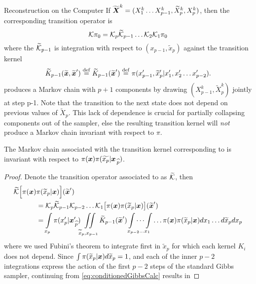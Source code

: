 \begin{chapter}{Reconstruction on the Computer}
If $\widetilde{\mbox{\boldmath$X$}}^k = (X_1^k\dots X_{p-1}^k,\widetilde X_{p}^k,X_p^k)$, then the corresponding transition operator is
\begin{equation}
  \mathcal K\pi_0 = \mathcal K_p \widetilde {\mathcal K}_{p-1}\dots \mathcal K_2 \mathcal K_1 \pi_0
\end{equation}
where the $\widetilde{\mathcal K}_{p-1}$ is integration with respect to $(x_{p-1},\tilde x_p)$ against the transition kernel
\begin{equation}
  \widetilde K_{p-1}(\widetilde{\mbox{\boldmath$x$}},\widetilde{\mbox{\boldmath$x$}}') \stackrel{\rm def}{=} \widetilde K_{p-1}(\widetilde{\mbox{\boldmath$x$}}') \stackrel{\rm def}{=} \pi(x_{p-1}',\widetilde x_p'|x_1',x_2'\dots x_{p-2}').
\end{equation}
 produces a Markov chain with $p+1$ components by drawing $(X_{p-1}^k,\tilde X_p^k)$ jointly at step p-1. 
Note that the transition to the next state does not depend on previous values of $\tilde X_p$.
This lack of dependence is crucial for partially collapsing components out of the sampler, else the resulting transition kernel will \emph{not} produce a Markov chain invariant with respect to $\pi$.
\begin{prop}\label{thm:conditionedGibbsStationary}
  The Markov chain associated with the transition kernel corresponding to  is invariant with respect to $\pi(\mbox{\boldmath$x$})\pi(\widetilde{x_p}|\mbox{\boldmath$x$}_{\,\widehat{p}})$.
\end{prop}
\begin{proof}
  Denote the transition operator associated to  as $\widetilde {\mathcal K}$, then
  \begin{align}
    \widetilde{\mathcal K}\Big[ \pi(\mbox{\boldmath$x$})&\pi(\widetilde x_p|\mbox{\boldmath$x$})\Big](\widetilde{\mbox{\boldmath$x$}}') \nonumber \\ 
    &= \mathcal K_p \widetilde{\mathcal K}_{p-1} \mathcal K_{p-2}\dots\mathcal K_{1} \big[\pi(\mbox{\boldmath$x$})\pi(\widetilde x_p|\mbox{\boldmath$x$})\big](\widetilde{\mbox{\boldmath$x$}}') \nonumber\\
    &= \int\limits_{x_p} \pi(x_p'|\mbox{\boldmath$x$}_{\,\widehat{p}}')\iint\limits_{\widetilde x_p,x_{p-1}}\widetilde K_{p-1}(\widetilde{\mbox{\boldmath$x$}}')\idotsint\limits_{x_{p-2}\dots x_1}\dots \pi(\mbox{\boldmath$x$})\pi(\widetilde x_p|\mbox{\boldmath$x$})dx_1\dots d\widetilde x_p dx_p \label{eq:conditionedGibbsCalc}
  \end{align}
  where we used Fubini's theorem to integrate first in $\tilde x_p$ for which each kernel $K_i$ does not depend. 
  Since  $\int\pi(\widetilde x_p|\mbox{\boldmath$x$})d\widetilde x_p = 1$, and each of the inner $p-2$ integrations express the action of the first $p-2$ steps of the standard Gibbs sampler, continuing from \eqref{eq:conditionedGibbsCalc} results in 

\end{proof}
\end{chapter}

